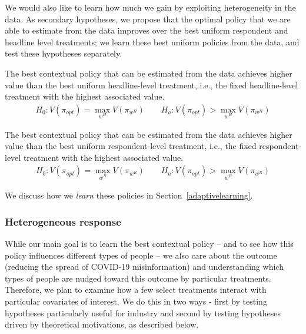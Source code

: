 \documentclass[letterpaper, 12pt, parskip=full,DIV=10]{scrartcl}
\begin{document}
We would also like to learn how much we gain by exploiting heterogeneity in the data. As secondary hypotheses, we propose that the optimal policy that we are able to estimate from the data improves over the best uniform respondent and headline level treatments; we learn these best uniform policies from the data, and test these hypotheses separately. 
\setcounter{hypothesis}{2}
  \begin{subhyp}
  The best contextual policy that can be estimated from the data achieves higher value than the best uniform headline-level treatment, i.e., the fixed headline-level treatment with the highest associated value. 
  \label{eq:optheadline}
\begin{align}
  H_{0}: V(\pi_{opt}) = \max_{w^H} V(\pi_{w^H}) \qquad H_{a}:  V(\pi_{opt}) > \max_{w^H} V(\pi_{w^H})
\end{align}
\end{subhyp}

  \begin{subhyp}
 The best contextual policy that can be estimated from the data achieves higher value than the best uniform respondent-level treatment, i.e., the fixed respondent-level treatment with the highest associated value. 
\begin{align}
  H_{0}: V(\pi_{opt}) = \max_{w^R} V(\pi_{w^R}) \qquad H_{a}:  V(\pi_{opt}) > \max_{w^R} V(\pi_{w^R})
\end{align}
\end{subhyp}

We discuss how we \textit{learn} these policies in Section~\ref{adaptivelearning}. 


\subsubsection{Heterogeneous response}\label{policieshte}

While our main goal is to learn the best contextual policy -- and to see how this policy influences different types of people -- we also care about the outcome (reducing the spread of COVID-19 misinformation) and understanding which types of people are nudged toward this outcome by particular treatments. Therefore, we plan to examine how a few select treatments interact with particular covariates of interest. We do this in two ways - first by testing hypotheses particularly useful for industry and second by testing hypotheses driven by theoretical motivations, as described below.
\end{document}
